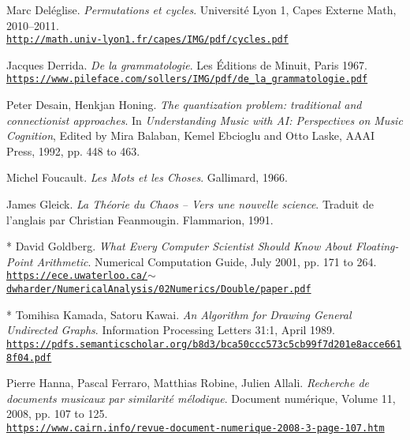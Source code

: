 \begin{thebibliography}{99}
		
	Marc Del\'{e}glise. \textit{Permutations et cycles}. Universit\'{e} Lyon 1, Capes Externe Math, 2010--2011.\\ \href{http://math.univ-lyon1.fr/capes/IMG/pdf/cycles.pdf}{\scriptsize{\texttt{http://math.univ-lyon1.fr/capes/IMG/pdf/cycles.pdf}}} \normalsize{}
	
	Jacques Derrida. \textit{De la grammatologie}. Les \'{E}ditions de Minuit, Paris 1967.\\ 
	\href{https://www.pileface.com/sollers/IMG/pdf/de\_la\_grammatologie.pdf}{\scriptsize{\texttt{https://www.pileface.com/sollers/IMG/pdf/de\_la\_grammatologie.pdf}}} \normalsize{}
	
	Peter Desain, Henkjan Honing. \textit{The quantization problem: traditional and connectionist approaches}. In \textit{Understanding Music with AI: Perspectives on Music Cognition}, Edited by Mira Balaban, Kemel Ebcioglu and Otto Laske, AAAI Press, 1992, pp. 448 to 463.
	
	Michel Foucault. \textit{Les Mots et les Choses}. Gallimard, 1966.

	James Gleick. \textit{La Th\'eorie du Chaos -- Vers une nouvelle science}. Traduit de l'anglais par Christian Feanmougin. Flammarion, 1991.
	
	 * David Goldberg. \textit{What Every Computer Scientist Should Know About Floating-Point Arithmetic}. Numerical Computation Guide, July 2001, pp. 171 to 264.\\ \href{https://ece.uwaterloo.ca/\~dwharder/NumericalAnalysis/02Numerics/Double/paper.pdf}{\scriptsize{\texttt{https://ece.uwaterloo.ca/$\sim$dwharder/NumericalAnalysis/02Numerics/Double/paper.pdf}}} \normalsize{}
	 
	 * Tomihisa Kamada, Satoru Kawai. \textit{An Algorithm for Drawing General Undirected Graphs}. Information Processing Letters 31:1, April 1989.\\ \href{https://pdfs.semanticscholar.org/b8d3/bca50ccc573c5cb99f7d201e8acce6618f04.pdf}{\scriptsize{\texttt{https://pdfs.semanticscholar.org/b8d3/bca50ccc573c5cb99f7d201e8acce6618f04.pdf}}} \normalsize{}
	 
	Pierre Hanna, Pascal Ferraro, Matthias Robine, Julien Allali. \textit{Recherche de documents musicaux par similarit\'{e} m\'{e}lodique}. Document num\'{e}rique, Volume 11, 2008, pp. 107 to 125.\\ 
	\href{https://www.cairn.info/revue-document-numerique-2008-3-page-107.htm}{\scriptsize{\texttt{https://www.cairn.info/revue-document-numerique-2008-3-page-107.htm}}} \normalsize{}
	 	 

\end{thebibliography}
